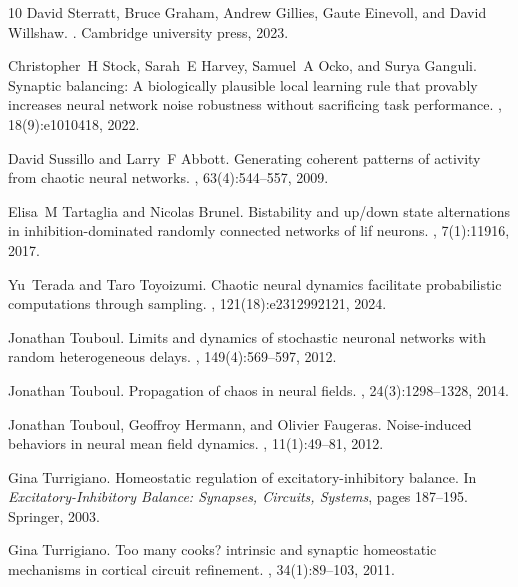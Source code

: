 \documentclass[onefignum,onetabnum]{siamart190516}
\newcommand{\1}{\mathbbm{1}}
\begin{document}
\begin{thebibliography}{10}
David Sterratt, Bruce Graham, Andrew Gillies, Gaute Einevoll, and David
  Willshaw.
.
\newblock Cambridge university press, 2023.

Christopher~H Stock, Sarah~E Harvey, Samuel~A Ocko, and Surya Ganguli.
\newblock Synaptic balancing: A biologically plausible local learning rule that
  provably increases neural network noise robustness without sacrificing task
  performance.
, 18(9):e1010418, 2022.

David Sussillo and Larry~F Abbott.
\newblock Generating coherent patterns of activity from chaotic neural
  networks.
, 63(4):544--557, 2009.

Elisa~M Tartaglia and Nicolas Brunel.
\newblock Bistability and up/down state alternations in inhibition-dominated
  randomly connected networks of lif neurons.
, 7(1):11916, 2017.

Yu~Terada and Taro Toyoizumi.
\newblock Chaotic neural dynamics facilitate probabilistic computations through
  sampling.
,
  121(18):e2312992121, 2024.

Jonathan Touboul.
\newblock Limits and dynamics of stochastic neuronal networks with random
  heterogeneous delays.
, 149(4):569--597, 2012.

Jonathan Touboul.
\newblock Propagation of chaos in neural fields.
, 24(3):1298--1328, 2014.

Jonathan Touboul, Geoffroy Hermann, and Olivier Faugeras.
\newblock Noise-induced behaviors in neural mean field dynamics.
, 11(1):49--81, 2012.

Gina Turrigiano.
\newblock Homeostatic regulation of excitatory-inhibitory balance.
\newblock In {\em Excitatory-Inhibitory Balance: Synapses, Circuits, Systems},
  pages 187--195. Springer, 2003.

Gina Turrigiano.
\newblock Too many cooks? intrinsic and synaptic homeostatic mechanisms in
  cortical circuit refinement.
, 34(1):89--103, 2011.


\end{thebibliography}
\end{document}
